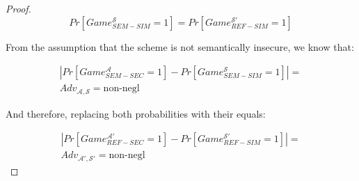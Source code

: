 \begin{proof}
    \begin{equation}
        Pr[Game_{SEM-SIM}^{\mathcal{S}} = 1] = Pr[Game_{REF-SIM}^{\mathcal{S'}} = 1]
    \end{equation}

    From the assumption that the scheme is not semantically insecure, we know
    that:

    \begin{align*}
        |Pr[Game_{SEM-SEC}^{\mathcal{A}} = 1] - Pr[Game_{SEM-SIM}^{\mathcal{S}} = 1]| =\\
        Adv_{\mathcal{A}, \mathcal{S}} = \text{non-negl}
    \end{align*}

    And therefore, replacing both probabilities with their equals:

    \begin{align*}
        |Pr[Game_{REF-SEC}^{\mathcal{A'}} = 1] -
        Pr[Game_{REF-SIM}^{\mathcal{S'}} = 1]| =\\
        Adv_{\mathcal{A'}, \mathcal{S'}} = \text{non-negl}
    \end{align*}
\end{proof}
